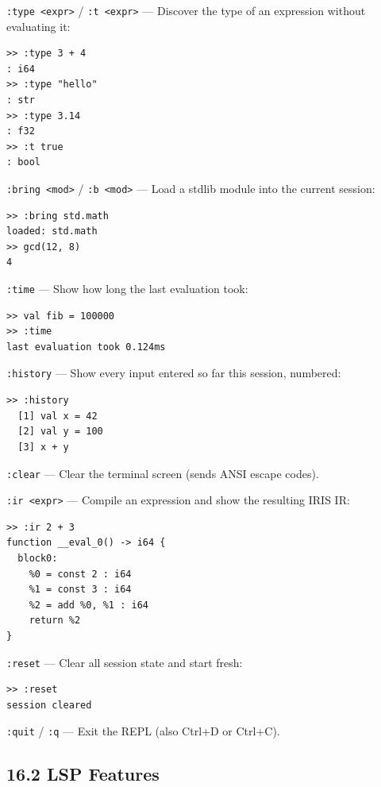 \documentclass[
  english,
]{book}
\begin{document}
\texttt{:type\ \textless{}expr\textgreater{}} /
\texttt{:t\ \textless{}expr\textgreater{}} --- Discover the type of an
expression without evaluating it:

\begin{verbatim}
>> :type 3 + 4
: i64
>> :type "hello"
: str
>> :type 3.14
: f32
>> :t true
: bool
\end{verbatim}

\texttt{:bring\ \textless{}mod\textgreater{}} /
\texttt{:b\ \textless{}mod\textgreater{}} --- Load a stdlib module into
the current session:

\begin{verbatim}
>> :bring std.math
loaded: std.math
>> gcd(12, 8)
4
\end{verbatim}

\texttt{:time} --- Show how long the last evaluation took:

\begin{verbatim}
>> val fib = 100000
>> :time
last evaluation took 0.124ms
\end{verbatim}

\texttt{:history} --- Show every input entered so far this session,
numbered:

\begin{verbatim}
>> :history
  [1] val x = 42
  [2] val y = 100
  [3] x + y
\end{verbatim}

\texttt{:clear} --- Clear the terminal screen (sends ANSI escape codes).

\texttt{:ir\ \textless{}expr\textgreater{}} --- Compile an expression
and show the resulting IRIS IR:

\begin{verbatim}
>> :ir 2 + 3
function __eval_0() -> i64 {
  block0:
    %0 = const 2 : i64
    %1 = const 3 : i64
    %2 = add %0, %1 : i64
    return %2
}
\end{verbatim}

\texttt{:reset} --- Clear all session state and start fresh:

\begin{verbatim}
>> :reset
session cleared
\end{verbatim}

\texttt{:quit} / \texttt{:q} --- Exit the REPL (also Ctrl+D or Ctrl+C).

\subsection{16.2 LSP Features}\label{lsp-features}
\end{document}
